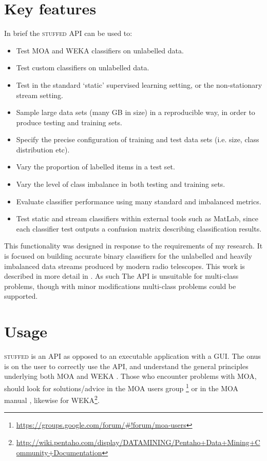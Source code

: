 \documentclass[twoside,a4paper]{refart}
\begin{document}
\section{Key features}
In brief the \textsc{stuffed} API can be used to:
\begin{itemize}
\item Test MOA and WEKA classifiers on unlabelled data.
\item Test custom classifiers on unlabelled data.
\item Test in the standard `static' supervised learning setting, or the non-stationary stream setting.
\item Sample large data sets (many GB in size) in a reproducible way, in order to produce testing and training sets.
\item Specify the precise configuration of training and test data sets (i.e. size, class distribution etc).
\item Vary the proportion of labelled items in a test set.
\item Vary the level of class imbalance in both testing and training sets.
\item Evaluate classifier performance using many standard and imbalanced metrics.
\item Test static and stream classifiers within external tools such as MatLab, since each classifier test outputs a confusion matrix describing classification results.
\end{itemize}
This functionality was designed in response to the requirements of my research. It is focused on building accurate binary classifiers for the unlabelled and heavily imbalanced data streams produced by modern radio telescopes. This work is described in more detail in \cite{Lyon:2013:jk,Lyon:2014:jk}. As such The API is unsuitable for multi-class problems, though with minor modifications multi-class problems could be supported.\newpage
\section{Usage}
\textsc{stuffed} is an API as opposed to an executable application with a GUI. The onus is on the user to correctly use the API, and understand the general principles underlying both MOA \cite{Moa:2011:ba} and WEKA \cite{weka}. Those who encounter problems with MOA, should look for solutions/advice in the MOA users group \footnote{\url{https://groups.google.com/forum/#!forum/moa-users}} or in the MOA manual \cite{Moa:2011:ba,moamanual}, likewise for WEKA\footnote{\url{http://wiki.pentaho.com/display/DATAMINING/Pentaho+Data+Mining+Community+Documentation}}. 
\end{document}
